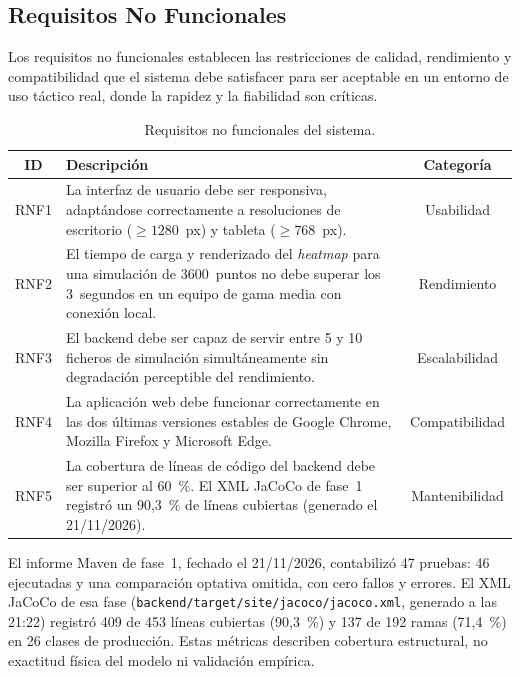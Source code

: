\subsection{Requisitos No Funcionales}
\label{subsec:req_nofunc}

Los requisitos no funcionales establecen las restricciones de calidad, rendimiento y
compatibilidad que el sistema debe satisfacer para ser aceptable en un entorno de uso
táctico real, donde la rapidez y la fiabilidad son críticas.

\begin{table}[H]
\centering
\caption{Requisitos no funcionales del sistema.}
\label{tab:req_nofunc}
\begin{tabular}{|c|p{10cm}|c|}
\hline
\textbf{ID} & \textbf{Descripción} & \textbf{Categoría} \\
\hline
RNF1 & La interfaz de usuario debe ser responsiva, adaptándose
       correctamente a resoluciones de escritorio ($\geq 1280$~px) y
       tableta ($\geq 768$~px). & Usabilidad \\
\hline
RNF2 & El tiempo de carga y renderizado del \textit{heatmap} para una
       simulación de 3600~puntos no debe superar los 3~segundos en un
       equipo de gama media con conexión local. & Rendimiento \\
\hline
RNF3 & El backend debe ser capaz de servir entre 5 y 10 ficheros de
       simulación simultáneamente sin degradación perceptible del
       rendimiento. & Escalabilidad \\
\hline
RNF4 & La aplicación web debe funcionar correctamente en las dos últimas
       versiones estables de Google Chrome, Mozilla Firefox y Microsoft
       Edge. & Compatibilidad \\
\hline
RNF5 & La cobertura de líneas de código del backend debe ser superior al
       60~\%. El XML JaCoCo de fase~1 registró un 90,3~\% de líneas cubiertas
       (generado el 21/11/2026). & Mantenibilidad \\
\hline
\end{tabular}
\end{table}

El informe Maven de fase~1, fechado el 21/11/2026, contabilizó 47 pruebas: 46 ejecutadas y
una comparación optativa omitida, con cero fallos y errores. El XML JaCoCo de esa fase
(\texttt{backend/target/site/jacoco/jacoco.xml}, generado a las 21:22) registró 409 de
453 líneas cubiertas (90,3~\%) y 137 de 192 ramas (71,4~\%) en 26 clases de producción.
Estas métricas describen cobertura estructural, no exactitud física del modelo ni
validación empírica.

